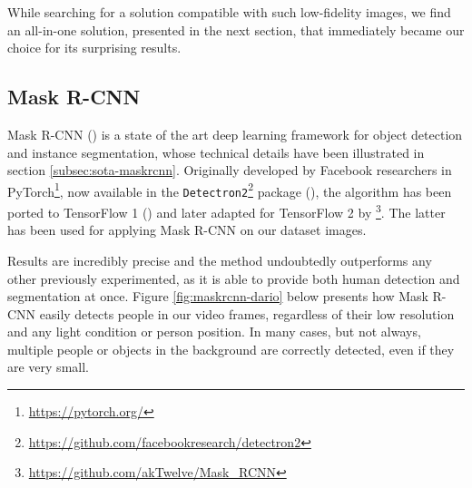 While searching for a solution compatible with such low-fidelity images, we find an all-in-one solution, presented in the next section, that immediately became our choice for its surprising results.



\subsection{Mask R-CNN}
\label{subsec:masking-maskrcnn}

Mask R-CNN (\cite{he2018mask}) is a state of the art deep learning framework for object detection and instance segmentation, whose technical details have been illustrated in section \ref{subsec:sota-maskrcnn}. Originally developed by Facebook researchers in PyTorch\footnote{\url{https://pytorch.org/}}, now available in the \texttt{Detectron2}\footnote{\url{https://github.com/facebookresearch/detectron2}} package (\cite{wu2019detectron2}), the algorithm has been ported to TensorFlow 1 (\cite{MaskRCNN_matterport}) and later adapted for TensorFlow 2 by \cite{MaskRCNN_akTwelve}\footnote{\url{https://github.com/akTwelve/Mask_RCNN}}. The latter has been used for applying Mask R-CNN on our dataset images.

\medskip

Results are incredibly precise and the method undoubtedly outperforms any other previously experimented, as it is able to provide both human detection and segmentation at once. Figure \ref{fig:maskrcnn-dario} below presents how Mask R-CNN easily detects people in our video frames, regardless of their low resolution and any light condition or person position. In many cases, but not always, multiple people or objects in the background are correctly detected, even if they are very small.

